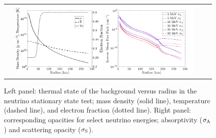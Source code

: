 \begin{figure}[h]
  \centering
  \begin{tabular}{cc}
    \includegraphics[width=0.45\textwidth]{figures/NStatinaryS_EOS}
    \includegraphics[width=0.45\textwidth]{figures/NSS_Opacities}
  \end{tabular}
   \caption{Left panel: thermal state of the background versus radius in the neutrino stationary state test; mass density (solid line), temperature (dashed line), and electron fraction (dotted line).  Right panel: corresponding opacities for select neutrino energies; absorptivity ($\sigma_{{\rm A}}$) and scattering opacity ($ \sigma_{{\rm S}}$).}
   \label{fig:NeutrinoStationaryTestEOS}
\end{figure}

